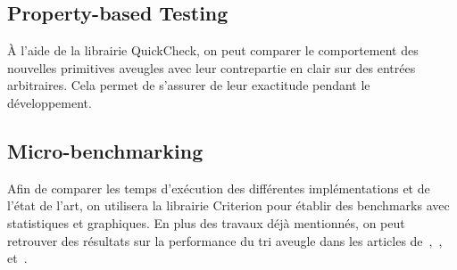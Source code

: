 \documentclass{article}
\begin{document}
\subsection{Property-based Testing}

À l'aide de la librairie QuickCheck, on peut comparer le comportement des nouvelles primitives aveugles avec leur contrepartie en clair sur des entrées arbitraires. Cela permet de s'assurer de leur exactitude pendant le développement.

\subsection{Micro-benchmarking}

Afin de comparer les temps d'exécution des différentes implémentations et de l'état de l'art, on utilisera la librairie Criterion pour établir des benchmarks avec statistiques et graphiques. En plus des travaux déjà mentionnés, on peut retrouver des résultats sur la performance du tri aveugle dans les articles de~\cite{baldimtsi_sorting_2014},~\cite{cryptoeprint:2011/122},~\cite{zuber2021efficient} et~\cite{choffrut_sable_2023}.

\newpage




\end{document}

